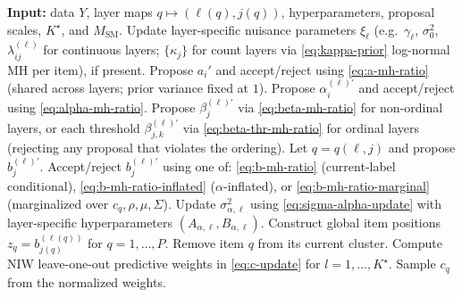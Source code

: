 \documentclass[11pt]{article}
\begin{document}
\begin{algorithm}[H]
\caption{One MCMC sweep: LSIRM update and collapsed label update}
\small
\begin{algorithmic}[1]
\State \textbf{Input:} data $Y$, layer maps $q\mapsto(\ell(q),j(q))$, hyperparameters, proposal scales, $K^\star$, and $M_{\mathrm{SM}}$.
\State Update layer-specific nuisance parameters $\xi_\ell$ (e.g.\ $\gamma_\ell$, $\sigma_0^2$, $\lambda_{ij}^{(\ell)}$ for continuous layers; $\{\kappa_j\}$ for count layers via \eqref{eq:kappa-prior} log-normal MH per item), if present.
    \State Propose $a_i'$ and accept/reject using \eqref{eq:a-mh-ratio} (shared across layers; prior variance fixed at $1$).
\EndFor
{}
        \State Propose $\alpha_i^{(\ell)\prime}$ and accept/reject using \eqref{eq:alpha-mh-ratio}.
    \EndFor
        \State Propose $\beta_j^{(\ell)\prime}$ via \eqref{eq:beta-mh-ratio} for non-ordinal layers, or each threshold $\beta_{j,k}^{(\ell)\prime}$ via \eqref{eq:beta-thr-mh-ratio} for ordinal layers (rejecting any proposal that violates the ordering).
        \State Let $q=q(\ell,j)$ and propose $b_j^{(\ell)\prime}$.
        \State Accept/reject $b_j^{(\ell)\prime}$ using one of: \eqref{eq:b-mh-ratio} (current-label conditional), \eqref{eq:b-mh-ratio-inflated} ($\alpha$-inflated), or \eqref{eq:b-mh-ratio-marginal} (marginalized over $c_q,\rho,\mu,\Sigma$).
    \EndFor
    \State Update $\sigma_{\alpha,\ell}^2$ using \eqref{eq:sigma-alpha-update} with layer-specific hyperparameters $(A_{\alpha,\ell},B_{\alpha,\ell})$.
\EndFor
\State Construct global item positions $z_q=b_{j(q)}^{(\ell(q))}$ for $q=1,\dots,P$.
    \State Remove item $q$ from its current cluster.
    \State Compute NIW leave-one-out predictive weights in \eqref{eq:c-update} for $l=1,\dots,K^\star$.
    \State Sample $c_q$ from the normalized weights.
\EndFor
\end{algorithmic}
\end{algorithm}
\end{document}
